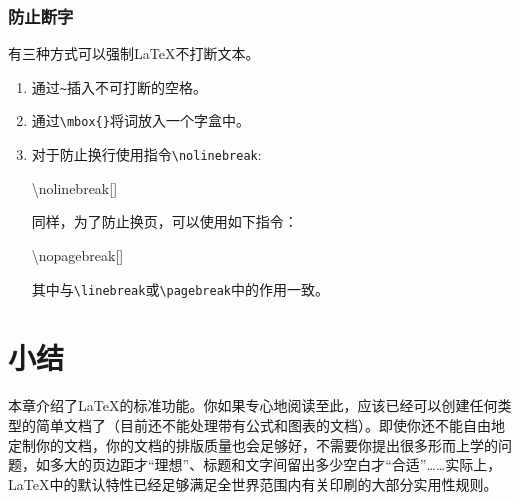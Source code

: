 \subsubsection{防止断字}

有三种方式可以强制\LaTeX 不打断文本。

\begin{enumerate}
  \item 通过\verb|~|插入不可打断的空格。
  \item 通过\verb|\mbox{|\verb|}|将词放入一个字盒中。
  \item 对于防止换行使用指令\verb|\nolinebreak|:
  
  \begin{dmd}
  \backslash nolinebreak[]
  \end{dmd}

  同样，为了防止换页，可以使用如下指令：

  \begin{dmd}
    \backslash nopagebreak[]
  \end{dmd}

  其中与\verb|\linebreak|或\verb|\pagebreak|中的作用一致。

\end{enumerate}

\section{小结}

本章介绍了\LaTeX 的标准功能。你如果专心地阅读至此，应该已经可以创建任何类型的简单文档了（目前还不能处理带有公式和图表的文档）。即使你还不能自由地定制你的文档，你的文档的排版质量也会足够好，不需要你提出很多形而上学的问题，如多大的页边距才“理想”、标题和文字间留出多少空白才“合适”……实际上，\LaTeX 中的默认特性已经足够满足全世界范围内有关印刷的大部分实用性规则。

